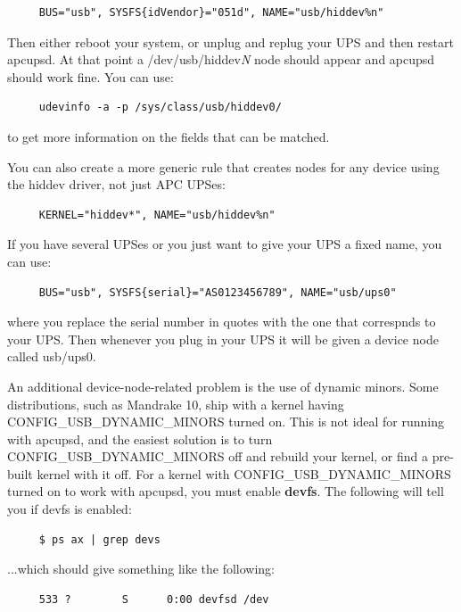\begin{verbatim}
     BUS="usb", SYSFS{idVendor}="051d", NAME="usb/hiddev%n"
\end{verbatim}

Then either reboot your system, or unplug and replug your UPS and then restart
apcupsd. At that point a /dev/usb/hiddev{\it N} node should appear and apcupsd
should work fine.  You can use: 

\begin{verbatim}
     udevinfo -a -p /sys/class/usb/hiddev0/
\end{verbatim}

to get more information on the fields that can be matched.

You can also create a more generic rule that creates nodes for any device
using the hiddev driver, not just APC UPSes:

\begin{verbatim}
     KERNEL="hiddev*", NAME="usb/hiddev%n"
\end{verbatim}

If you have several UPSes or you just want to give your UPS a fixed name, you
can use: 

\begin{verbatim}
     BUS="usb", SYSFS{serial}="AS0123456789", NAME="usb/ups0"
\end{verbatim}

where you replace the serial number in quotes with the one that correspnds to
your UPS. Then whenever you plug in your UPS it will be given a device node
called usb/ups0.

An additional device-node-related problem is the use of dynamic minors. Some
distributions, such as Mandrake 10, ship with a kernel having
CONFIG\_USB\_DYNAMIC\_MINORS turned on. This is not ideal for running with
apcupsd, and the easiest solution is to turn CONFIG\_USB\_DYNAMIC\_MINORS off
and rebuild your kernel, or find a pre-built kernel with it off. For a kernel with
CONFIG\_USB\_DYNAMIC\_MINORS turned on to work with apcupsd, you must enable
{\bf devfs}. The following will tell you if devfs is enabled: 

\begin{verbatim}
     $ ps ax | grep devs
\end{verbatim}

...which should give something like the following: 

\begin{verbatim}
     533 ?        S      0:00 devfsd /dev
\end{verbatim}

